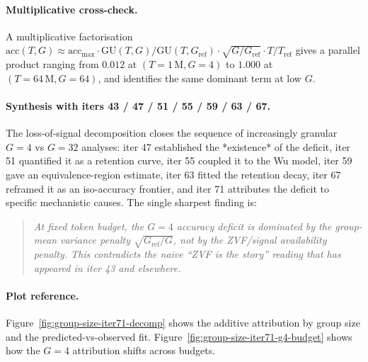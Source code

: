 \paragraph{Multiplicative cross-check.}
A multiplicative factorisation
$\mathrm{acc}(T, G) \approx
\mathrm{acc}_{\max} \cdot
\mathrm{GU}(T,G)/\mathrm{GU}(T, G_{\mathrm{ref}}) \cdot
\sqrt{G/G_{\mathrm{ref}}} \cdot T/T_{\mathrm{ref}}$
gives a parallel product ranging from $0.012$ at
$(T{=}1\,\mathrm{M}, G{=}4)$ to $1.000$ at $(T{=}64\,\mathrm{M},
G{=}64)$, and identifies the same dominant term at low $G$.

\paragraph{Synthesis with iters 43 / 47 / 51 / 55 / 59 / 63 / 67.}
The loss-of-signal decomposition closes the sequence of
increasingly granular $G{=}4$ vs $G{=}32$ analyses: iter 47
established the *existence* of the deficit, iter 51 quantified it
as a retention curve, iter 55 coupled it to the Wu model, iter 59
gave an equivalence-region estimate, iter 63 fitted the retention
decay, iter 67 reframed it as an iso-accuracy frontier, and iter 71
attributes the deficit to specific mechanistic causes.  The single
sharpest finding is:

\begin{quote}
\emph{At fixed token budget, the $G{=}4$ accuracy deficit is
dominated by the group-mean variance penalty
$\sqrt{G_{\mathrm{ref}}/G}$, not by the ZVF/signal availability
penalty.  This contradicts the naive ``ZVF is the story''
reading that has appeared in iter 43 and elsewhere.}
\end{quote}

\paragraph{Plot reference.}
Figure~\ref{fig:group-size-iter71-decomp} shows the additive
attribution by group size and the predicted-vs-observed fit.
Figure~\ref{fig:group-size-iter71-g4-budget} shows how the $G{=}4$
attribution shifts across budgets.


